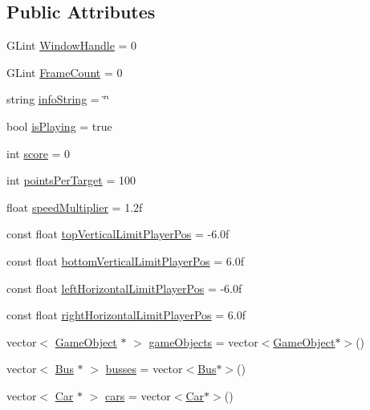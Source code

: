 \subsection*{Public Attributes}
\begin{DoxyCompactItemize}
\item 
G\+Lint \hyperlink{class_game_manager_a7292d1f46ee4141dbb1b6a7a8cc134f2}{Window\+Handle} = 0
\item 
G\+Lint \hyperlink{class_game_manager_a0d7672e0e14f75901291a62862d7eb60}{Frame\+Count} = 0
\item 
string \hyperlink{class_game_manager_a8e65d4c5dca91cb6af25bf6c25d2a009}{info\+String} = \char`\"{}\char`\"{}
\item 
bool \hyperlink{class_game_manager_a8faf5fabfe8174f79f449b60065b8048}{is\+Playing} = true
\item 
int \hyperlink{class_game_manager_aceb9f59354267d31fc6dfb023a695854}{score} = 0
\item 
int \hyperlink{class_game_manager_ab2ed8869ac478caf69ea29e6de26ea80}{points\+Per\+Target} = 100
\item 
float \hyperlink{class_game_manager_ac6d13a816358fd7c754f4ef1fb82f7e4}{speed\+Multiplier} = 1.\+2f
\item 
const float \hyperlink{class_game_manager_a34e763c41e51dccf7241b784de62e381}{top\+Vertical\+Limit\+Player\+Pos} = -\/6.\+0f
\item 
const float \hyperlink{class_game_manager_aac2d3978ba280076a75ba8863c2da9ac}{bottom\+Vertical\+Limit\+Player\+Pos} = 6.\+0f
\item 
const float \hyperlink{class_game_manager_af27090b5d1db50311f0453de5df095bc}{left\+Horizontal\+Limit\+Player\+Pos} = -\/6.\+0f
\item 
const float \hyperlink{class_game_manager_ad0bc4e5fd9c85e9b25bd4579a508151f}{right\+Horizontal\+Limit\+Player\+Pos} = 6.\+0f
\item 
vector$<$ \hyperlink{class_game_object}{Game\+Object} $\ast$ $>$ \hyperlink{class_game_manager_a8b02c0a19f162a651041cddb4821a82c}{game\+Objects} = vector$<$\hyperlink{class_game_object}{Game\+Object}$\ast$$>$()
\item 
vector$<$ \hyperlink{class_bus}{Bus} $\ast$ $>$ \hyperlink{class_game_manager_aaca42616afec776da2bf0ccd0641f8e0}{busses} = vector$<$\hyperlink{class_bus}{Bus}$\ast$$>$()
\item 
vector$<$ \hyperlink{class_car}{Car} $\ast$ $>$ \hyperlink{class_game_manager_af6d97ab7a3c0df3c4999aa60c7dcc083}{cars} = vector$<$\hyperlink{class_car}{Car}$\ast$$>$()
$$
\end{DoxyCompactItemize}
